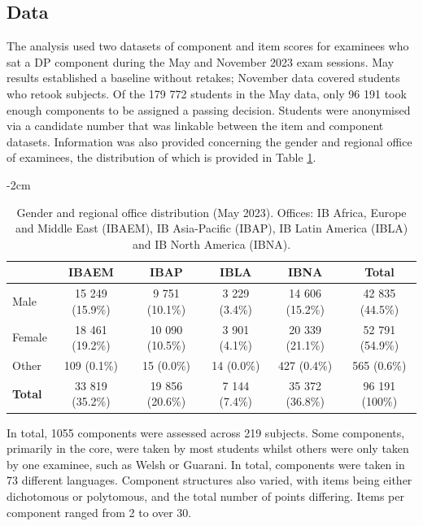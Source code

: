 \documentclass[12pt]{article}
\begin{document}
\subsection{Data}

The analysis used two datasets of component and item scores for examinees who sat a DP component during the May and November 2023 exam sessions. May results established a baseline without retakes; November data covered students who retook subjects. Of the 179 772 students in the May data, only 96 191 took enough components to be assigned a passing decision. Students were anonymised via a candidate number that was linkable between the item and component datasets. Information was also provided concerning the gender and regional office of examinees, the distribution of which is provided in Table \ref{tab:Descrip}.

\begin{table}[H]
    \centering
    \addtolength{\leftskip} {-2cm}
    \addtolength{\rightskip}{-2cm}
    \caption{Gender and regional office distribution (May 2023). Offices: IB Africa, Europe and Middle East (IBAEM), IB Asia-Pacific (IBAP), IB Latin America (IBLA) and IB North America (IBNA).}
    \label{tab:Descrip}
    \begin{tabular}{lccccc}
        \toprule
        & IBAEM & IBAP & IBLA & IBNA & \textbf{Total} \\
        \midrule
        Male   & 15 249 (15.9\%) & 9 751 (10.1\%) & 3 229 (3.4\%) & 14 606 (15.2\%) & 42 835 (44.5\%) \\
        Female & 18 461 (19.2\%) & 10 090 (10.5\%) & 3 901 (4.1\%) & 20 339 (21.1\%) & 52 791 (54.9\%) \\
        Other & 109 (0.1\%) & 15 (0.0\%) & 14 (0.0\%) & 427 (0.4\%) & 565 (0.6\%)\\
        \textbf{Total} & 33 819 (35.2\%) & 19 856 (20.6\%) & 7 144 (7.4\%) & 35 372 (36.8\%) & 96 191 (100\%)\\
        \bottomrule
    \end{tabular}
\end{table}

In total, 1055 components were assessed across 219 subjects. Some components, primarily in the core, were taken by most students whilst others were only taken by one examinee, such as Welsh or Guarani. In total, components were taken in 73 different languages. Component structures also varied, with items being either dichotomous or polytomous, and the total number of points differing. Items per component ranged from 2 to over 30.
\end{document}
